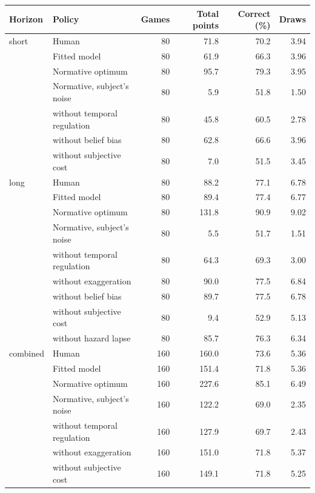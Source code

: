 \begin{tabular}{llrrrr}
\toprule
Horizon & Policy & Games & Total points & Correct (\%) & Draws \\
\midrule
short & Human & 80 & 71.8 & 70.2 & 3.94 \\
 & Fitted model & 80 & 61.9 & 66.3 & 3.96 \\
 & Normative optimum & 80 & 95.7 & 79.3 & 3.95 \\
 & Normative, subject's noise & 80 & 5.9 & 51.8 & 1.50 \\
 & \quad without temporal regulation & 80 & 45.8 & 60.5 & 2.78 \\
 & \quad without belief bias & 80 & 62.8 & 66.6 & 3.96 \\
 & \quad without subjective cost & 80 & 7.0 & 51.5 & 3.45 \\
\midrule
long & Human & 80 & 88.2 & 77.1 & 6.78 \\
 & Fitted model & 80 & 89.4 & 77.4 & 6.77 \\
 & Normative optimum & 80 & 131.8 & 90.9 & 9.02 \\
 & Normative, subject's noise & 80 & 5.5 & 51.7 & 1.51 \\
 & \quad without temporal regulation & 80 & 64.3 & 69.3 & 3.00 \\
 & \quad without exaggeration & 80 & 90.0 & 77.5 & 6.84 \\
 & \quad without belief bias & 80 & 89.7 & 77.5 & 6.78 \\
 & \quad without subjective cost & 80 & 9.4 & 52.9 & 5.13 \\
 & \quad without hazard lapse & 80 & 85.7 & 76.3 & 6.34 \\
\midrule
combined & Human & 160 & 160.0 & 73.6 & 5.36 \\
 & Fitted model & 160 & 151.4 & 71.8 & 5.36 \\
 & Normative optimum & 160 & 227.6 & 85.1 & 6.49 \\
 & Normative, subject's noise & 160 & 122.2 & 69.0 & 2.35 \\
 & \quad without temporal regulation & 160 & 127.9 & 69.7 & 2.43 \\
 & \quad without exaggeration & 160 & 151.0 & 71.8 & 5.37 \\
 & \quad without subjective cost & 160 & 149.1 & 71.8 & 5.25 \\
\bottomrule
\end{tabular}

